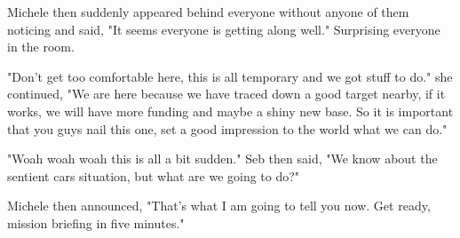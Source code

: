 Michele then suddenly appeared behind everyone without anyone of them noticing and said, "It seems everyone is getting along well."
Surprising everyone in the room. 

"Don't get too comfortable here, this is all temporary and we got stuff to do." she continued, 
"We are here because we have traced down a good target nearby, if it works, we will have more funding and maybe a shiny new base. So it is important that you guys nail this one, set a good impression to the world what we can do."

"Woah woah woah this is all a bit sudden." Seb then said, "We know about the sentient cars situation, but what are we going to do?"

Michele then announced, "That's what I am going to tell you now. Get ready, mission briefing in five minutes."
